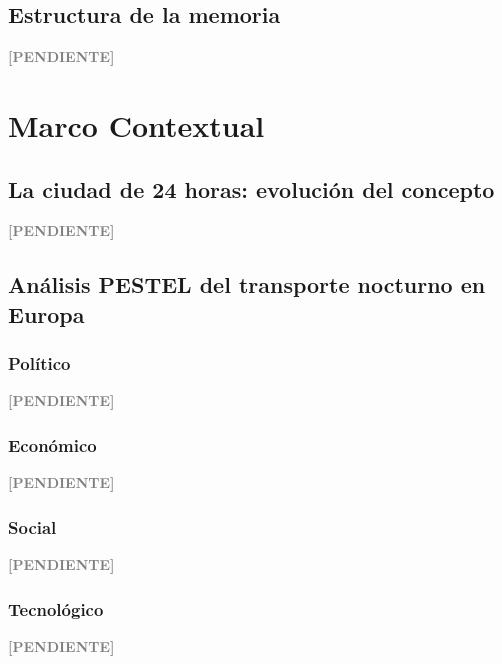 \documentclass[12pt,a4paper]{article}
\newenvironment{pendiente}
  {\par\vspace{4pt}\noindent\textcolor{gray}{\textbf{[PENDIENTE]}}\par\begingroup\color{gray}\small}
  {\endgroup\par\vspace{4pt}}
\begin{document}
\subsection{Estructura de la memoria}
\begin{pendiente}
\end{pendiente}



\section{Marco Contextual}

\subsection{La ciudad de 24 horas: evolución del concepto}
\begin{pendiente}
\end{pendiente}

\subsection{Análisis PESTEL del transporte nocturno en Europa}

\subsubsection{Político}
\begin{pendiente}
\end{pendiente}

\subsubsection{Económico}
\begin{pendiente}
\end{pendiente}

\subsubsection{Social}
\begin{pendiente}
\end{pendiente}

\subsubsection{Tecnológico}
\begin{pendiente}
\end{pendiente}
\end{document}
